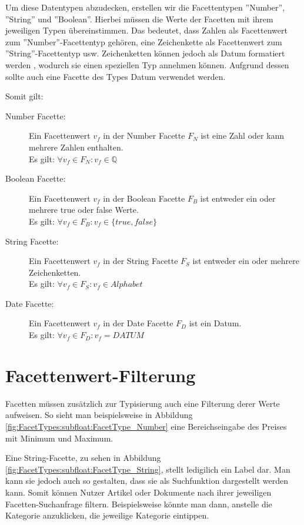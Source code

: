 Um diese Datentypen abzudecken, erstellen wir die Facettentypen ''Number'', ''String'' und ''Boolean''.
Hierbei müssen die Werte der Facetten mit ihrem jeweiligen Typen übereinstimmen. Das bedeutet, dass Zahlen als Facet\-ten\-wert zum ''Number''-Facetten\-typ gehören, eine Zeichen\-kette als Facetten\-wert zum ''String''-Facetten\-typ usw.
Zeichenketten können jedoch als Datum formatiert werden \cite{TODO Datums-Formatierung}, wodurch sie einen speziellen Typ annehmen können.
Aufgrund dessen sollte auch eine Facette des Types Datum verwendet werden.

Somit gilt:
\begin{description}
    \item[Number Facette:]
    Ein Facettenwert \(v_f\) in der Number Facette \(F_N\) ist eine Zahl oder kann mehrere Zahlen enthalten.
    \\Es gilt: \(\forall v_f \in F_N: v_f \in \mathbb{Q}\)
    \item[Boolean Facette:]
    Ein Facettenwert \(v_f\) in der Boolean Facette \(F_B\) ist entweder ein oder mehrere true oder false Werte.
    \\Es gilt: \(\forall v_f \in F_B: v_f \in \{true, false\}\)
    \item[String Facette:]
    Ein Facettenwert \(v_f\) in der String Facette \(F_S\) ist entweder ein oder mehrere Zeichenketten.
    \\Es gilt: \(\forall v_f \in F_S: v_f \in Alphabet\)
    \item[Date Facette:]
    Ein Facettenwert \(v_f\) in der Date Facette \(F_D\) ist ein Datum.
    \\Es gilt: \(\forall v_f \in F_D: v_f = DATUM\)
\end{description}

\section{Facettenwert-Filterung}
\label{sec:Konzeption:FacetValue_filtering}
Facetten müssen zusätzlich zur Typisierung auch eine Filterung derer Werte aufweisen.
So sieht man beispielsweise in Abbildung \ref{fig:FacetTypes:subfloat:FacetType_Number} eine Bereichseingabe des Preises mit Minimum und Maximum.

Eine String-Facette, zu sehen in Abbildung \ref{fig:FacetTypes:subfloat:FacetType_String}, stellt ledigilich ein Label dar.
Man kann sie jedoch auch so gestalten, dass sie als Suchfunktion dargestellt werden kann. Somit können Nutzer Artikel oder Dokumente nach ihrer jeweiligen Facetten-Suchanfrage filtern.
Beispielsweise könnte man dann, anstelle die Kategorie anzuklicken, die jeweilige Kategorie eintippen.


